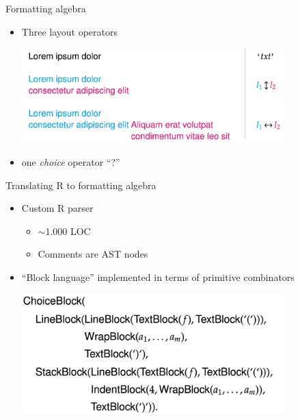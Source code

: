\documentclass[xcolor=dvipsnames]{beamer}
\theoremstyle{definition}
\begin{document}
\begin{frame}{Formatting algebra}
  \begin{itemize}
      \item Three layout operators
        \begin{center}
          \includegraphics[width=0.8\textwidth]{img/layouts-rfmt.png}
        \end{center}
    \item one \emph{choice} operator ``?''
  \end{itemize}
\end{frame}
\begin{frame}{Translating R to formatting algebra}
  \begin{itemize}
    \item Custom R parser
      \begin{itemize}
        \item $\sim$1.000 LOC
        \item Comments are AST nodes
      \end{itemize}
      \item ``Block language'' implemented in terms of primitive combinators
        \begin{center}
          \includegraphics[width=0.8\textwidth]{img/block-rfmt.png}
        \end{center}
  \end{itemize}
\end{frame}
\end{document}
